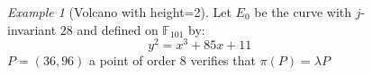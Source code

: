 \documentclass[10pt,a4paper]{beamer}
\theoremstyle{plain}
\theoremstyle{definition}
\theoremstyle{definition}
\theoremstyle{definition}
\theoremstyle{definition}
\theoremstyle{remark}
\theoremstyle{remark}
\newtheorem{exe}[thm]{Example}
\begin{document}
\begin{frame}
\begin{columns}

\begin{column}[l]{4cm}
\begin{exe}[Volcano with height=2]
Let $E_0$ be the curve with $j$-invariant $28$ and defined on $\mathbb{F}_{101}$ by: 
\[y^2=x^3+85x+11\]
$P=(36,96)$ a point of order $8$ verifies that $\pi(P)=\lambda P$


\begin{itemize}
\end{itemize}


\end{exe}
\end{column}

\begin{column}[r]{7cm}
\begin{figure}[h]
		\begin{center}
		

\end{center}
\end{figure}
\end{column}
\end{columns}
\end{frame}
\end{document}
